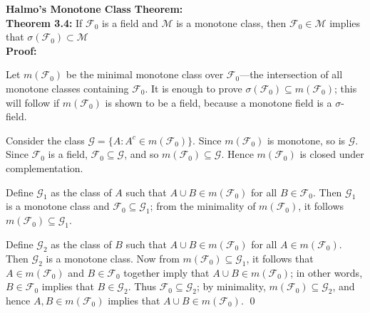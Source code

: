     \textbf{Halmo's Monotone Class Theorem:}\\
    \textbf{Theorem 3.4: }If $\mathcal{F}_0$ is a field and $\mathcal{M}$ is a monotone class, then $\mathcal{F}_0\in \mathcal{M}$ implies that $\sigma(\mathcal{F}_0)\subset \mathcal{M}$ \\[-5pt]
    
    \textbf{Proof: }
    \vspace{-1ex}
    \begin{proofline}
    Let \( m(\mathcal{F}_0) \) be the minimal monotone class over \( \mathcal{F}_0 \)—the intersection of all monotone classes containing \( \mathcal{F}_0 \). It is enough to prove \( \sigma(\mathcal{F}_0) \subseteq m(\mathcal{F}_0) \); this will follow if \( m(\mathcal{F}_0) \) is shown to be a field, because a monotone field is a \( \sigma \)-field.

    Consider the class \( \mathcal{G} = \{ A : A^c \in m(\mathcal{F}_0) \} \). Since \( m(\mathcal{F}_0) \) is monotone, so is \( \mathcal{G} \). Since \( \mathcal{F}_0 \) is a field, \( \mathcal{F}_0 \subseteq \mathcal{G} \), and so \( m(\mathcal{F}_0) \subseteq \mathcal{G} \). Hence \( m(\mathcal{F}_0) \) is closed under complementation.
    
    Define \( \mathcal{G}_1 \) as the class of \( A \) such that \( A \cup B \in m(\mathcal{F}_0) \) for all \( B \in \mathcal{F}_0 \). Then \( \mathcal{G}_1 \) is a monotone class and \( \mathcal{F}_0 \subseteq \mathcal{G}_1 \); from the minimality of \( m(\mathcal{F}_0) \), it follows \( m(\mathcal{F}_0) \subseteq \mathcal{G}_1 \).
    
    Define \( \mathcal{G}_2 \) as the class of \( B \) such that \( A \cup B \in m(\mathcal{F}_0) \) for all \( A \in m(\mathcal{F}_0) \). Then \( \mathcal{G}_2 \) is a monotone class. Now from \( m(\mathcal{F}_0) \subseteq \mathcal{G}_1 \), it follows that \( A \in m(\mathcal{F}_0) \) and \( B \in \mathcal{F}_0 \) together imply that \( A \cup B \in m(\mathcal{F}_0) \); in other words, \( B \in \mathcal{F}_0 \) implies that \( B \in \mathcal{G}_2 \). Thus \( \mathcal{F}_0 \subseteq \mathcal{G}_2 \); by minimality, \( m(\mathcal{F}_0) \subseteq \mathcal{G}_2 \), and hence \( A, B \in m(\mathcal{F}_0) \) implies that \( A \cup B \in m(\mathcal{F}_0) \). \hfill \qed
    \end{proofline}

     \quad
    
